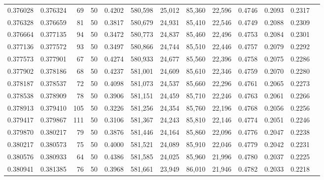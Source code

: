 \begin{tabular}{rrrrrrrrrrrrr}
0.376028 & 0.376324 &    69 &  50 &                                     0.4202 & 580,598 &  25,012 &  85,360 &  22,596 & 0.4746 & 0.2093 & 0.2317 \\
0.376328 & 0.376659 &    81 &  50 &                                     0.3817 & 580,679 &  24,931 &  85,410 &  22,546 & 0.4749 & 0.2088 & 0.2309 \\
0.376664 & 0.377135 &    94 &  50 &                                     0.3472 & 580,773 &  24,837 &  85,460 &  22,496 & 0.4753 & 0.2084 & 0.2301 \\
0.377136 & 0.377572 &    93 &  50 &                                     0.3497 & 580,866 &  24,744 &  85,510 &  22,446 & 0.4757 & 0.2079 & 0.2292 \\
0.377573 & 0.377901 &    67 &  50 &                                     0.4274 & 580,933 &  24,677 &  85,560 &  22,396 & 0.4758 & 0.2075 & 0.2286 \\
0.377902 & 0.378186 &    68 &  50 &                                     0.4237 & 581,001 &  24,609 &  85,610 &  22,346 & 0.4759 & 0.2070 & 0.2280 \\
0.378187 & 0.378537 &    72 &  50 &                                     0.4098 & 581,073 &  24,537 &  85,660 &  22,296 & 0.4761 & 0.2065 & 0.2273 \\
0.378538 & 0.378909 &    78 &  50 &                                     0.3906 & 581,151 &  24,459 &  85,710 &  22,246 & 0.4763 & 0.2061 & 0.2266 \\
0.378913 & 0.379410 &   105 &  50 &                                     0.3226 & 581,256 &  24,354 &  85,760 &  22,196 & 0.4768 & 0.2056 & 0.2256 \\
0.379417 & 0.379867 &   111 &  50 &                                     0.3106 & 581,367 &  24,243 &  85,810 &  22,146 & 0.4774 & 0.2051 & 0.2246 \\
0.379870 & 0.380217 &    79 &  50 &                                     0.3876 & 581,446 &  24,164 &  85,860 &  22,096 & 0.4776 & 0.2047 & 0.2238 \\
0.380217 & 0.380573 &    75 &  50 &                                     0.4000 & 581,521 &  24,089 &  85,910 &  22,046 & 0.4779 & 0.2042 & 0.2231 \\
0.380576 & 0.380933 &    64 &  50 &                                     0.4386 & 581,585 &  24,025 &  85,960 &  21,996 & 0.4780 & 0.2037 & 0.2225 \\
0.380941 & 0.381385 &    76 &  50 &                                     0.3968 & 581,661 &  23,949 &  86,010 &  21,946 & 0.4782 & 0.2033 & 0.2218 \\

\end{tabular}
